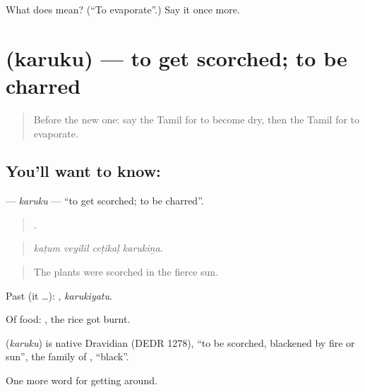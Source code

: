 \begin{tcolorbox}[breakable,colback=teal!4,colframe=teal!35!black,title={Before you move on}]
What does  mean? (\textquotedblleft{}To evaporate\textquotedblright{}.) Say it once more.
\end{tcolorbox}
\section[\texorpdfstring{\ta{கருகு} (karuku)}{கருகு (karuku)}]{ (karuku) — to get scorched; to be charred}

\label{lesson:TA-C431-karuku}



\begin{quote}
Before the new one: say the Tamil for to become dry, then the Tamil for to evaporate.
\end{quote}

\subsection*{You'll want to know: }
\textbf{} — \emph{karuku} — \textquotedblleft{}to get scorched; to be charred\textquotedblright{}.

\begin{quote}
   .
\end{quote}

\begin{quote}
\emph{kaṭum veyilil ceṭikaḷ karukiṉa.}
\end{quote}

\begin{quote}
The plants were scorched in the fierce sun.
\end{quote}

Past (it …): , \emph{karukiyatu}.

Of food:  , the rice got burnt.

\begin{cousinweb}
\textbf{} (\emph{karuku}) is native Dravidian (DEDR 1278), \textquotedblleft{}to be scorched, blackened by fire or sun\textquotedblright{}, the family of , \textquotedblleft{}black\textquotedblright{}.
\end{cousinweb}

\begin{grammarlens}[title={What you've built}]
One more word for getting around.
\end{grammarlens}

